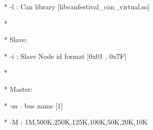 \documentclass[a4paper,12pt]{book}
\begin{document}
{\ttfamily
* \space \space \space \space {}-l : Can library
[{\textquotedbl}libcanfestival\_can\_virtual.so{\textquotedbl}]
\space \space \space \space *}

{\ttfamily
*
\space \space \space \space \space \space \space \space \space \space \space \space \space \space \space \space \space \space \space \space \space \space \space \space \space \space \space \space \space \space \space \space \space \space \space \space \space \space \space \space \space \space \space \space \space \space \space \space \space \space \space \space \space \space \space \space \space \space \space *}

{\ttfamily
* \space \space \space Slave:
\space \space \space \space \space \space \space \space \space \space \space \space \space \space \space \space \space \space \space \space \space \space \space \space \space \space \space \space \space \space \space \space \space \space \space \space \space \space \space \space \space \space \space \space \space \space \space \space \space *}

{\ttfamily
* \space \space \space \space {}-i : Slave Node id format [0x01 , 0x7F]
\space \space \space \space \space \space \space \space \space \space \space \space \space \space \space *}

{\ttfamily
*
\space \space \space \space \space \space \space \space \space \space \space \space \space \space \space \space \space \space \space \space \space \space \space \space \space \space \space \space \space \space \space \space \space \space \space \space \space \space \space \space \space \space \space \space \space \space \space \space \space \space \space \space \space \space \space \space \space \space \space *}

{\ttfamily
* \space \space \space Master:
\space \space \space \space \space \space \space \space \space \space \space \space \space \space \space \space \space \space \space \space \space \space \space \space \space \space \space \space \space \space \space \space \space \space \space \space \space \space \space \space \space \space \space \space \space \space \space \space *}

{\ttfamily
* \space \space \space \space {}-m : bus name [{\textquotedbl}1{\textquotedbl}]
\space \space \space \space \space \space \space \space \space \space \space \space \space \space \space \space \space \space \space \space \space \space \space \space \space \space \space \space \space \space \space \space \space \space \space *}

{\ttfamily
* \space \space \space \space {}-M : 1M,500K,250K,125K,100K,50K,20K,10K
\space \space \space \space \space \space \space \space \space \space \space \space \space \space \space *}
\end{document}
